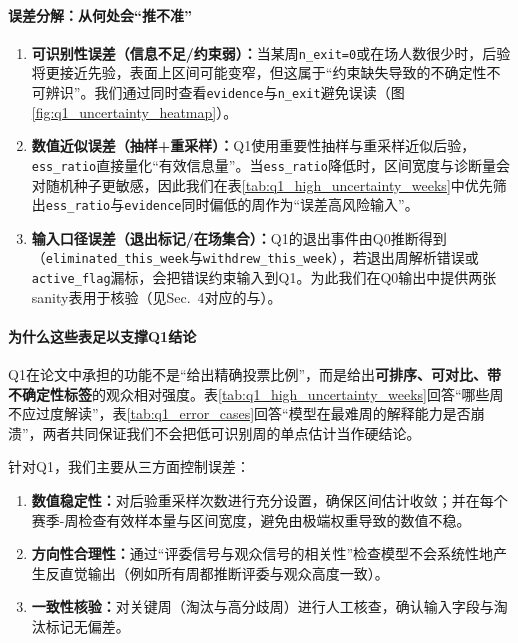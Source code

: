 \paragraph{误差分解：从何处会“推不准”}
\begin{enumerate}[label=(\arabic*),leftmargin=2.4em]
    \item \textbf{可识别性误差（信息不足/约束弱）：}当某周\texttt{n\_exit=0}或在场人数很少时，后验将更接近先验，表面上区间可能变窄，但这属于“约束缺失导致的不确定性不可辨识”。我们通过同时查看\texttt{evidence}与\texttt{n\_exit}避免误读（图\ref{fig:q1_uncertainty_heatmap}）。
    \item \textbf{数值近似误差（抽样+重采样）：}Q1使用重要性抽样与重采样近似后验，\texttt{ess\_ratio}直接量化“有效信息量”。当\texttt{ess\_ratio}降低时，区间宽度与诊断量会对随机种子更敏感，因此我们在表\ref{tab:q1_high_uncertainty_weeks}中优先筛出\texttt{ess\_ratio}与\texttt{evidence}同时偏低的周作为“误差高风险输入”。
    \item \textbf{输入口径误差（退出标记/在场集合）：}Q1的退出事件由Q0推断得到（\texttt{eliminated\_this\_week}与\texttt{withdrew\_this\_week}），若退出周解析错误或\texttt{active\_flag}漏标，会把错误约束输入到Q1。为此我们在Q0输出中提供两张sanity表用于核验（见Sec.~4对应的与）。
\end{enumerate}

\paragraph{为什么这些表足以支撑Q1结论}
Q1在论文中承担的功能不是“给出精确投票比例”，而是给出\textbf{可排序、可对比、带不确定性标签}的观众相对强度。表\ref{tab:q1_high_uncertainty_weeks}回答“哪些周不应过度解读”，表\ref{tab:q1_error_cases}回答“模型在最难周的解释能力是否崩溃”，两者共同保证我们不会把低可识别周的单点估计当作硬结论。

针对Q1，我们主要从三方面控制误差：
\begin{enumerate}[label=(\arabic*),leftmargin=2.4em]
    \item \textbf{数值稳定性：}对后验重采样次数进行充分设置，确保区间估计收敛；并在每个赛季-周检查有效样本量与区间宽度，避免由极端权重导致的数值不稳。
    \item \textbf{方向性合理性：}通过“评委信号与观众信号的相关性”检查模型不会系统性地产生反直觉输出（例如所有周都推断评委与观众高度一致）。
    \item \textbf{一致性核验：}对关键周（淘汰与高分歧周）进行人工核查，确认输入字段与淘汰标记无偏差。
\end{enumerate}

